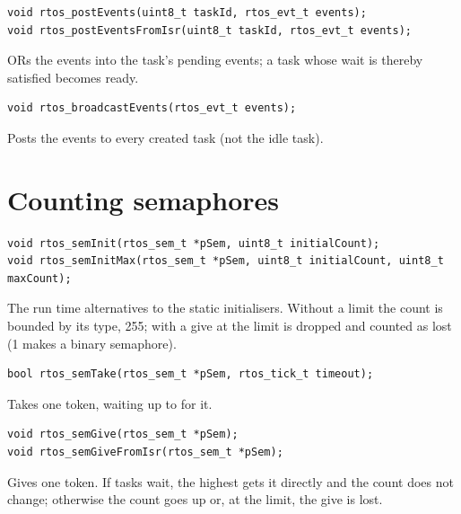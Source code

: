 \begin{lstlisting}
void rtos_postEvents(uint8_t taskId, rtos_evt_t events);
void rtos_postEventsFromIsr(uint8_t taskId, rtos_evt_t events);
\end{lstlisting}
ORs the events into the task's pending events; a task whose wait is thereby satisfied
becomes ready.

\begin{lstlisting}
void rtos_broadcastEvents(rtos_evt_t events);
\end{lstlisting}
Posts the events to every created task (not the idle task).

\section{Counting semaphores}

\begin{lstlisting}
void rtos_semInit(rtos_sem_t *pSem, uint8_t initialCount);
void rtos_semInitMax(rtos_sem_t *pSem, uint8_t initialCount, uint8_t maxCount);
\end{lstlisting}
The run time alternatives to the static initialisers. Without a limit the count is
bounded by its type, 255; with  a give at the limit is dropped and counted
as lost (1 makes a binary semaphore).

\begin{lstlisting}
bool rtos_semTake(rtos_sem_t *pSem, rtos_tick_t timeout);
\end{lstlisting}
Takes one token, waiting up to  for it.

\begin{lstlisting}
void rtos_semGive(rtos_sem_t *pSem);
void rtos_semGiveFromIsr(rtos_sem_t *pSem);
\end{lstlisting}
Gives one token. If tasks wait, the highest gets it directly and the count does not
change; otherwise the count goes up or, at the limit, the give is lost.

